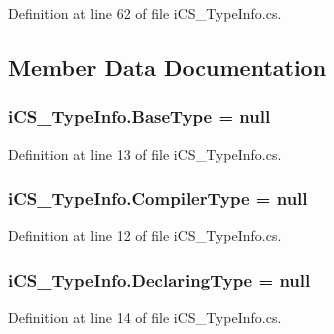 Definition at line 62 of file i\+C\+S\+\_\+\+Type\+Info.\+cs.



\subsection{Member Data Documentation}
\hypertarget{classi_c_s___type_info_ab606c79dec06b45713ca377b2c3a0cf2}{
\subsubsection[{Base\+Type}]{ i\+C\+S\+\_\+\+Type\+Info.\+Base\+Type = null}}\label{classi_c_s___type_info_ab606c79dec06b45713ca377b2c3a0cf2}


Definition at line 13 of file i\+C\+S\+\_\+\+Type\+Info.\+cs.

\hypertarget{classi_c_s___type_info_a5a5fb932ca08cd3f82ac805448033ebb}{
\subsubsection[{Compiler\+Type}]{ i\+C\+S\+\_\+\+Type\+Info.\+Compiler\+Type = null}}\label{classi_c_s___type_info_a5a5fb932ca08cd3f82ac805448033ebb}


Definition at line 12 of file i\+C\+S\+\_\+\+Type\+Info.\+cs.

\hypertarget{classi_c_s___type_info_a615906610a1efcf56bd93714dcdd5e58}{
\subsubsection[{Declaring\+Type}]{ i\+C\+S\+\_\+\+Type\+Info.\+Declaring\+Type = null}}\label{classi_c_s___type_info_a615906610a1efcf56bd93714dcdd5e58}


Definition at line 14 of file i\+C\+S\+\_\+\+Type\+Info.\+cs.

